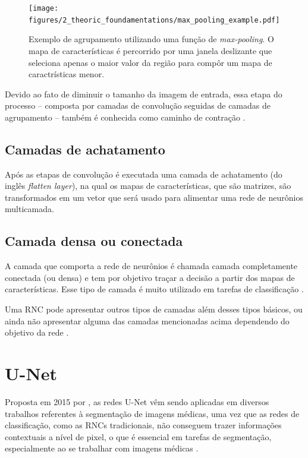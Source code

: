 \begin{figure}[H]
  \centering
  \texttt{[image: figures/2\_theoric\_foundamentations/max\_pooling\_example.pdf]}
  \caption[Agrupamento utilizando uma função de \textit{max-pooling}.]{Exemplo de agrupamento utilizando uma função de \textit{max-pooling}. O mapa de características é percorrido por uma janela deslizante que seleciona apenas o maior valor da região para compôr um mapa de caractrísticas menor.}
  \label{fig:pooling}
\end{figure}

Devido ao fato de diminuir o tamanho da imagem de entrada, essa etapa do processo -- composta por camadas de convolução seguidas de camadas de agrupamento -- também é conhecida como caminho de contração \cite{geron2019maos}.

\subsection{Camadas de achatamento}

Após as etapas de convolução é executada uma camada de achatamento (do inglês \textit{flatten layer}), na qual os mapas de características, que são matrizes, são transformados em um vetor que será usado para alimentar uma rede de neurônios multicamada. 

\subsection{Camada densa ou conectada}
A camada que comporta a rede de neurônios é chamada camada completamente conectada (ou densa) e tem por objetivo traçar a decisão a partir dos mapas de características. Esse tipo de camada é muito utilizado em tarefas de classificação \cite{rawat2017deep}.

Uma \ac{RNC} pode apresentar outros tipos de camadas além desses tipos básicos, ou ainda não apresentar alguma das camadas mencionadas acima dependendo do objetivo da rede \cite{mueller2019deep}.

\section{U-Net}
Proposta em 2015 por \cite{ronneberger2015u}, as redes U-Net vêm sendo aplicadas em diversos trabalhos referentes à segmentação de imagens médicas, uma vez que as redes de classificação, como as \ac{RNC}s tradicionais, não conseguem trazer informações contextuais a nível de pixel, o que é essencial em tarefas de segmentação, especialmente ao se trabalhar com imagens médicas \cite{siddique2021u}. 

